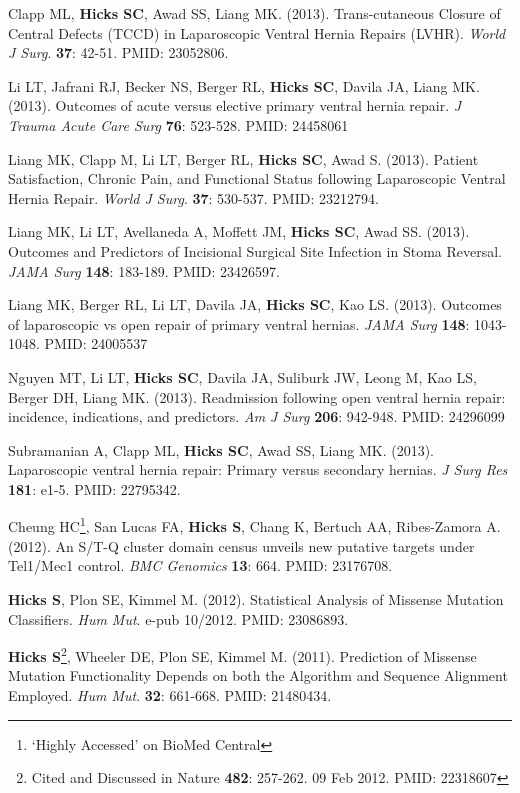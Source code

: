 \documentclass[10pt]{article}
\begin{document}
\begin{enumerate}[label= {[\arabic*]}]
\item Clapp ML, \textbf{Hicks SC}, Awad SS, Liang MK. (2013). Trans-cutaneous Closure of Central Defects (TCCD) in Laparoscopic Ventral Hernia Repairs (LVHR). {\it World J Surg}. {\bf 37}: 42-51. PMID: 23052806.
\item Li LT, Jafrani RJ, Becker NS, Berger RL,  {\bf Hicks SC}, Davila JA, Liang MK. (2013). Outcomes of acute versus elective primary ventral hernia repair. {\it J Trauma Acute Care Surg} {\bf 76}: 523-528. PMID: 24458061
\item Liang MK, Clapp M, Li LT, Berger RL, {\bf Hicks SC}, Awad S. (2013). Patient Satisfaction, Chronic Pain, and Functional Status following Laparoscopic Ventral Hernia Repair. {\it World J Surg}. {\bf 37}: 530-537. PMID: 23212794. 
\item Liang MK, Li LT, Avellaneda A, Moffett JM, {\bf Hicks SC}, Awad SS. (2013). Outcomes and Predictors of Incisional Surgical Site Infection in Stoma Reversal. {\it JAMA Surg} {\bf 148}: 183-189. PMID: 23426597. 
\item Liang MK, Berger RL, Li LT, Davila JA, {\bf Hicks SC}, Kao LS. (2013). Outcomes of laparoscopic vs open repair of primary ventral hernias. {\it JAMA Surg} {\bf 148}: 1043-1048. PMID: 24005537 
\item Nguyen MT, Li LT, {\bf Hicks SC}, Davila JA, Suliburk JW, Leong M, Kao LS, Berger DH, Liang MK. (2013). Readmission following open ventral hernia repair: incidence, indications, and predictors. {\it Am J Surg} {\bf 206}: 942-948. PMID: 24296099
\item Subramanian A, Clapp ML, {\bf Hicks SC}, Awad SS, Liang MK. (2013). Laparoscopic ventral hernia repair: Primary versus secondary hernias. {\it J Surg Res} {\bf 181}: e1-5. PMID: 22795342.
\item Cheung HC\footnote{ `Highly Accessed' on BioMed Central}, San Lucas FA, \textbf{Hicks S}, Chang K, Bertuch AA, Ribes-Zamora A. (2012). An S/T-Q cluster domain census unveils new putative targets under Tel1/Mec1 control. {\it BMC Genomics} {\bf 13}: 664. PMID: 23176708. 
\item \textbf{Hicks S}, Plon SE, Kimmel M. (2012). Statistical Analysis of Missense Mutation Classifiers. {\it Hum Mut}. e-pub 10/2012. PMID: 23086893. 
\item \textbf{Hicks S}\footnote{Cited and Discussed in Nature {\bf 482}: 257-262. 09 Feb 2012. PMID: 22318607}, Wheeler DE, Plon SE, Kimmel M. (2011). Prediction of Missense Mutation Functionality Depends on both the Algorithm and Sequence Alignment Employed. {\it Hum Mut}. {\bf 32}: 661-668. PMID: 21480434.
\end{enumerate}
\end{document}
